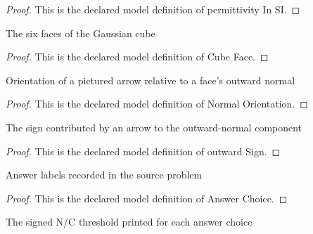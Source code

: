 \begin{proof}
  This is the declared model definition of permittivity In SI.
\end{proof}
\begin{definition}
  \label{def:physics:phyx-mini-0841:phyxminiproblems-problemphyxmini0841-cubeface}
  The six faces of the Gaussian cube
\end{definition}
\begin{proof}
  This is the declared model definition of Cube Face.
\end{proof}
\begin{definition}
  \label{def:physics:phyx-mini-0841:phyxminiproblems-problemphyxmini0841-normalorientation}
  Orientation of a pictured arrow relative to a face's outward normal
\end{definition}
\begin{proof}
  This is the declared model definition of Normal Orientation.
\end{proof}
\begin{definition}
  \label{def:physics:phyx-mini-0841:phyxminiproblems-problemphyxmini0841-normalorientation-outwardsign}
  The sign contributed by an arrow to the outward-normal component
\end{definition}
\begin{proof}
  This is the declared model definition of outward Sign.
\end{proof}
\begin{definition}
  \label{def:physics:phyx-mini-0841:phyxminiproblems-problemphyxmini0841-answerchoice}
  Answer labels recorded in the source problem
\end{definition}
\begin{proof}
  This is the declared model definition of Answer Choice.
\end{proof}
\begin{definition}
  \label{def:physics:phyx-mini-0841:phyxminiproblems-problemphyxmini0841-answerchoicereadoutinnewtonspercoulomb}
  The signed N/C threshold printed for each answer choice
\end{definition}
